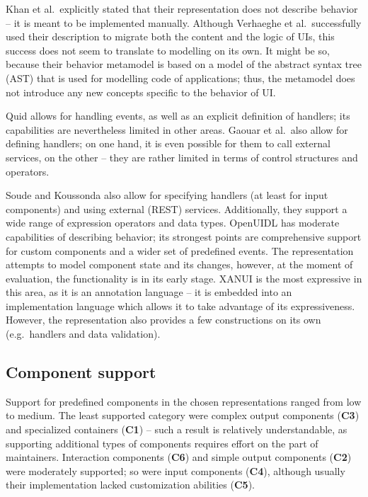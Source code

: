 Khan et al.\ explicitly stated that their representation does not describe behavior -- it is meant to be implemented manually.
Although Verhaeghe et al.\ successfully used their description to migrate both the content and the logic of UIs, this success does not seem to translate to modelling on its own.
It might be so, because their behavior metamodel is based on a model of the abstract syntax tree (AST) that is used for modelling code of applications;
thus, the metamodel does not introduce any new concepts specific to the behavior of UI\@.

Quid allows for handling events, as well as an explicit definition of handlers; its capabilities are nevertheless limited in other areas.
Gaouar et al.\ also allow for defining handlers; on one hand, it is even possible for them to call external services, on the other -- they are rather limited in terms of control structures and operators.

Soude and Koussonda also allow for specifying handlers (at least for input components) and using external (REST) services.
Additionally, they support a wide range of expression operators and data types.
OpenUIDL has moderate capabilities of describing behavior;
its strongest points are comprehensive support for custom components and a wider set of predefined events.
The representation attempts to model component state and its changes, however, at the moment of evaluation, the functionality is in its early stage.
XANUI is the most expressive in this area, as it is an annotation language -- it is embedded into an implementation language which allows it to take advantage of its expressiveness.
However, the representation also provides a few constructions on its own (e.g.\ handlers and data validation).

\subsection{Component support}\label{subsec:4-2-component-support}
Support for predefined components in the chosen representations ranged from low to medium.
The least supported category were complex output components (\textbf{C3}) and specialized containers (\textbf{C1}) -- such a result is relatively understandable, as supporting additional types of components requires effort on the part of maintainers.
Interaction components (\textbf{C6}) and simple output components (\textbf{C2}) were moderately supported;
so were input components (\textbf{C4}), although usually their implementation lacked customization abilities (\textbf{C5}).

